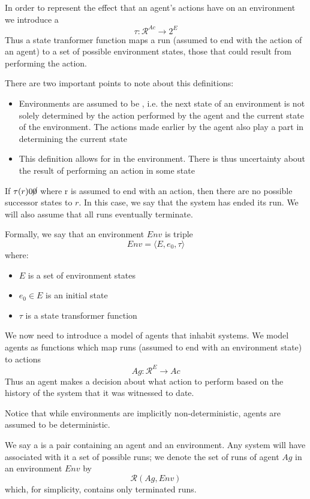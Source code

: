 In order to represent the effect that an agent's actions have on an environment we introduce a 
\[\tau : \mathcal{R}^{Ac}\rightarrow 2^E\]
Thus a state tranformer function maps a run (assumed to end with the action of an agent) to a set of possible environment states, those that could result from performing the action.

There are two important points to note about this definitions:
\begin{itemize}
\item Environments are assumed to be , i.e. the next state of an environment is not solely determined by the action performed by the agent and the current state of the environment. The actions made earlier by the agent also play a part in determining the current state
\item This definition allows for  in the environment. There is thus uncertainty about the result of performing an action in some state
\end{itemize}

If $\tau(r) 0 \cancel{0}$ where r is assumed to end with an action, then there are no possible successor states to $r$. In this case, we say that the system has ended its run. We will also assume that all runs eventually terminate.

Formally, we say that an environment $Env$ is triple 
\[Env=\langle E, e_0,\tau\rangle\]
where:
\begin{itemize}
\item $E$ is a set of environment states
\item $e_0 \in E$ is an initial state
\item $\tau$ is a state transformer function
\end{itemize}

We now need to introduce a model of agents that inhabit systems. We model agents as functions which map runs (assumed to end with an environment state) to actions
\[Ag: \mathcal{R}^E \rightarrow Ac\]
Thus an agent makes a decision about what action to perform based on the history of the system that it was witnessed to date.

Notice that while environments are implicitly non-deterministic, agents are assumed to be deterministic.

We say a  is a pair containing an agent and an environment. Any system will have associated with it a set of possible runs; we denote the set of runs of agent $Ag$ in an environment $Env$ by
\[\mathcal{R}(Ag, Env)\]
which, for simplicity, contains only terminated runs.

